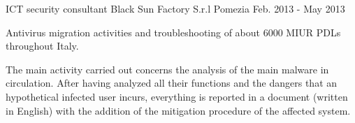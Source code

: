 \begin{cventries}
  \cventry
    {ICT security consultant} %
    {Black Sun Factory S.r.l } %
    {Pomezia} %
    {Feb. 2013 - May 2013} %
    {
      \begin{cvitems} %
        \item {Antivirus migration activities and troubleshooting of about 6000 MIUR PDLs throughout Italy.}
        \item {The main activity carried out concerns the analysis of the main malware in circulation.
              After having analyzed all their functions and the dangers that an hypothetical infected
              user incurs, everything is reported in a document (written in English) with the addition of
              the mitigation procedure of the affected system.}
      \end{cvitems}
    }

\end{cventries}
